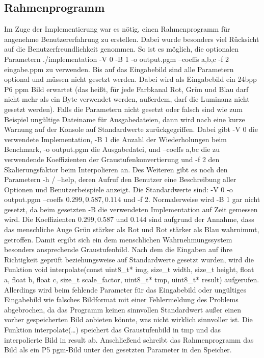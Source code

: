 \documentclass[course=erap]{aspdoc}
\begin{document}
\subsection{Rahmenprogramm}
Im Zuge der Implementierung war es nötig, einen Rahmenprogramm für angenehme Benutzererfahrung zu erstellen. Dabei wurde besonders viel Rücksicht auf die Benutzerfreundlichkeit genommen. So ist es möglich, die optionalen Parametern ./implementation -V 0 -B 1 -o output.pgm --coeffs a,b,c -f 2 eingabe.ppm zu verwenden. Bis auf das Eingabebild sind alle Parametern optional und müssen nicht gesetzt werden. Dabei wird als Eingabebild ein 24bpp P6 ppm Bild erwartet (das heißt, für jede Farbkanal Rot, Grün und Blau darf nicht mehr als ein Byte verwendet werden, außerdem, darf die Luminanz nicht gesetzt werden). Falls die Parametern nicht gesetzt oder falsch sind wie zum Beispiel ungültige Dateiname für Ausgabedateien, dann wird nach eine kurze Warnung auf der Konsole auf Standardwerte zurückgegriffen. Dabei gibt -V 0 die verwendete Implementation, -B 1 die Anzahl der Wiederholungen beim Benchmark, -o output.pgm die Ausgabedatei, und --coeffs a,bc die zu verwendende Koeffizienten der Graustufenkonvertierung und -f 2 den Skalierungsfaktor beim Interpolieren an. Des Weiteren gibt es noch den Parametern -h / --help, deren Aufruf den Benutzer eine Beschreibung aller Optionen und Benutzerbeispiele anzeigt. Die Standardwerte sind: -V 0 -o output.pgm --coeffs $0.299,0.587,0.114$ und -f 2. Normalerweise wird -B 1 gar nicht gesetzt, da beim gesetzten -B die verwendeten Implementation auf Zeit gemessen wird. Die Koeffizienten $0.299, 0.587$ und $0.144$ sind aufgrund der Annahme, dass das menschliche Auge Grün stärker als Rot und Rot stärker als Blau wahrnimmt, getroffen. Damit ergibt sich ein dem menschlichen Wahrnehmungssystem besonders ansprechende Graustufenbild. Nach dem die Eingaben auf ihre Richtigkeit geprüft beziehungsweise auf Standardwerte gesetzt wurden, wird die Funktion void interpolate(const uint8\_t* img, size\_t width, size\_t height, float a, float b, float c, size\_t scale\_factor, uint8\_t* tmp, uint8\_t* result) aufgerufen. Allerdings wird beim fehlende Parameter für das Eingabebild oder ungültiges Eingabebild wie falsches Bildformat mit einer Fehlermeldung des Problems abgebrochen, da das Programm keinen sinnvollen Standardwert außer einen vorher gespeicherten Bild anbieten könnte, was nicht wirklich sinnvoller ist. Die Funktion interpolate(…) speichert das Graustufenbild in tmp und das interpolierte Bild in result ab. Anschließend schreibt das Rahmenprogramm das Bild als ein P5 pgm-Bild unter den gesetzten Parameter in den Speicher.
\end{document}
